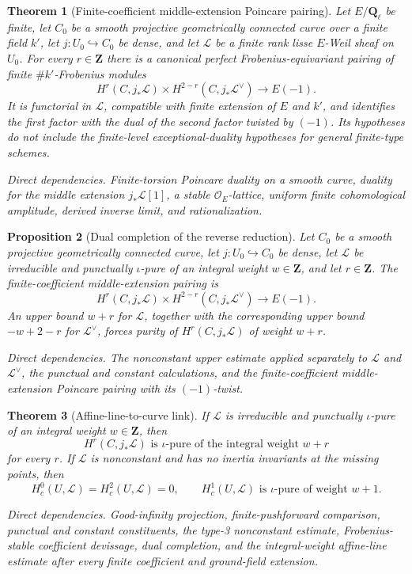 \documentclass[10pt]{article}
\newtheorem{theorem}{Theorem}[section]
\newtheorem{proposition}[theorem]{Proposition}
\theoremstyle{definition}
\newcommand{\Ql}{\mathbf Q_\ell}
\newcommand{\dep}[1]{\par\smallskip\noindent\textit{Direct dependencies.} #1\par}
\begin{document}
\begin{theorem}[Finite-coefficient middle-extension Poincare pairing]
Let \(E/\Ql\) be finite, let \(C_0\) be a smooth projective geometrically
connected curve over a finite field \(k'\), let
\(j:U_0\hookrightarrow C_0\) be dense, and let \(\mathcal L\) be a finite
rank lisse \(E\)-Weil sheaf on \(U_0\).  For every \(r\in\mathbf Z\) there
is a canonical perfect Frobenius-equivariant pairing of finite
\(\#k'\)-Frobenius modules
\[
 H^r(C,j_*\mathcal L)\times
 H^{2-r}(C,j_*\mathcal L^\vee)
 \longrightarrow E(-1).
\]
It is functorial in \(\mathcal L\), compatible with finite extension of
\(E\) and \(k'\), and identifies the first factor with the dual of the
second factor twisted by \((-1)\).  Its hypotheses do not include the
finite-level exceptional-duality hypotheses for general finite-type
schemes.
\dep{Finite-torsion Poincare duality on a smooth curve, duality for the
middle extension \(j_*\mathcal L[1]\), a stable \(\mathcal O_E\)-lattice,
uniform finite cohomological amplitude, derived inverse limit, and
rationalization.}
\end{theorem}

\begin{proposition}[Dual completion of the reverse reduction]
Let \(C_0\) be a smooth projective geometrically connected curve, let
\(j:U_0\hookrightarrow C_0\) be dense, let \(\mathcal L\) be irreducible
and punctually \(\iota\)-pure of an integral weight \(w\in\mathbf Z\), and
let \(r\in\mathbf Z\).  The
finite-coefficient middle-extension
pairing is
\[
 H^r(C,j_*\mathcal L)\times
 H^{2-r}(C,j_*\mathcal L^\vee)
 \longrightarrow E(-1).
\]
An upper bound \(w+r\) for \(\mathcal L\), together with the corresponding
upper bound \(-w+2-r\) for \(\mathcal L^\vee\), forces purity of
\(H^r(C,j_*\mathcal L)\) of weight \(w+r\).
\dep{The nonconstant upper estimate applied separately to
\(\mathcal L\) and \(\mathcal L^\vee\), the punctual and constant
calculations, and the finite-coefficient middle-extension Poincare pairing
with its \((-1)\)-twist.}
\end{proposition}

\begin{theorem}[Affine-line-to-curve link]
If \(\mathcal L\) is irreducible and punctually \(\iota\)-pure of an
integral weight \(w\in\mathbf Z\), then
\[
                   H^r(C,j_*\mathcal L)
       \text{ is \(\iota\)-pure of the integral weight }w+r
\]
for every \(r\).  If \(\mathcal L\) is nonconstant and has no inertia
invariants at the missing points, then
\[
 H_c^0(U,\mathcal L)=H_c^2(U,\mathcal L)=0,
 \qquad H_c^1(U,\mathcal L)\text{ is \(\iota\)-pure of weight }w+1.
\]
\dep{Good-infinity projection, finite-pushforward comparison, punctual and
constant constituents, the type-3 nonconstant estimate, Frobenius-stable
coefficient devissage, dual completion, and the integral-weight affine-line
estimate after every finite coefficient and ground-field extension.}
\end{theorem}
\end{document}
